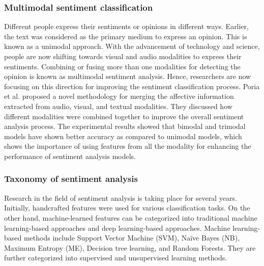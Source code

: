 \subsubsection{Multimodal sentiment classification}

Different people express their sentiments or opinions in different ways. Earlier, the text was considered as the primary medium to express an opinion. This is known as a unimodal approach. With the advancement of technology and science, people are now shifting towards visual and audio modalities to express their sentiments. Combining or fusing more than one modalities for detecting the opinion is known as multimodal sentiment analysis. Hence, researchers are now focusing on this direction for improving the sentiment classification process. Poria et al.\cite{Poria_2016} proposed a novel methodology for merging the affective information extracted from audio, visual, and textual modalities. They discussed how different modalities were combined together to improve the overall sentiment analysis process. The experimental results showed that bimodal and trimodal models
have shown better accuracy as compared to unimodal models, which shows the importance
of using features from all the modality for enhancing the performance of sentiment analysis
models.

\subsubsection{Taxonomy of sentiment analysis}

Research in the field of sentiment analysis is taking place for several years. Initially, handcrafted features were used for various classification tasks. On the other hand, machine-learned features can be categorized into traditional machine learning-based approaches and deep learning-based approaches. Machine learning-based methods include Support Vector Machine (SVM), Naïve Bayes (NB), Maximum Entropy (ME), Decision tree learning, and Random Forests. They are further categorized into supervised and unsupervised learning methods.